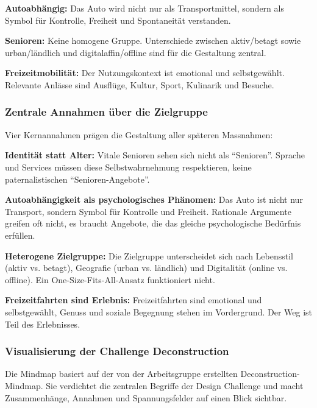 \textbf{Autoabhängig:} Das Auto wird nicht nur als Transportmittel, sondern als Symbol für Kontrolle, Freiheit und Spontaneität verstanden.

\textbf{Senioren:} Keine homogene Gruppe.
Unterschiede zwischen aktiv/betagt sowie urban/ländlich und digitalaffin/offline sind für die Gestaltung zentral.

\textbf{Freizeitmobilität:} Der Nutzungskontext ist emotional und selbstgewählt.
Relevante Anlässe sind Ausflüge, Kultur, Sport, Kulinarik und Besuche.

\subsubsection{Zentrale Annahmen über die Zielgruppe}

Vier Kernannahmen prägen die Gestaltung aller späteren Massnahmen:

\textbf{Identität statt Alter:} Vitale Senioren sehen sich nicht als ``Senioren''.
Sprache und Services müssen diese Selbstwahrnehmung respektieren, keine paternalistischen ``Senioren-Angebote''.

\textbf{Autoabhängigkeit als psychologisches Phänomen:} Das Auto ist nicht nur Transport, sondern Symbol für Kontrolle und Freiheit.
Rationale Argumente greifen oft nicht, es braucht Angebote, die das gleiche psychologische Bedürfnis erfüllen.

\textbf{Heterogene Zielgruppe:} Die Zielgruppe unterscheidet sich nach Lebensstil (aktiv vs. betagt), Geografie (urban vs. ländlich) und Digitalität (online vs. offline).
Ein One-Size-Fits-All-Ansatz funktioniert nicht.

\textbf{Freizeitfahrten sind Erlebnis:} Freizeitfahrten sind emotional und selbstgewählt, Genuss und soziale Begegnung stehen im Vordergrund.
Der Weg ist Teil des Erlebnisses.

\subsubsection{Visualisierung der Challenge Deconstruction}
Die Mindmap basiert auf der von der Arbeitsgruppe erstellten Deconstruction-Mindmap.
Sie verdichtet die zentralen Begriffe der Design Challenge und macht Zusammenhänge, Annahmen und Spannungsfelder auf einen Blick sichtbar.
\newpage


